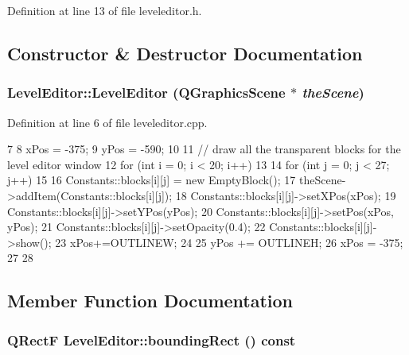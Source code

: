 Definition at line 13 of file leveleditor.h.

\subsection{Constructor \& Destructor Documentation}
\hypertarget{class_level_editor_a1d91bc06c0a93456587434b37fe726b4}{
\subsubsection[{LevelEditor}]{\setlength{\rightskip}{0pt plus 5cm}LevelEditor::LevelEditor (QGraphicsScene $\ast$ {\em theScene})}}
\label{class_level_editor_a1d91bc06c0a93456587434b37fe726b4}


Definition at line 6 of file leveleditor.cpp.


\begin{DoxyCode}
7 {
8     xPos = -375;
9     yPos = -590;
10 
11     // draw all the transparent blocks for the level editor window
12     for (int i = 0; i < 20; i++)
13     {
14         for (int j = 0; j < 27; j++)
15         {
16             Constants::blocks[i][j] = new EmptyBlock();
17             theScene->addItem(Constants::blocks[i][j]);
18             Constants::blocks[i][j]->setXPos(xPos);
19             Constants::blocks[i][j]->setYPos(yPos);
20             Constants::blocks[i][j]->setPos(xPos, yPos);
21             Constants::blocks[i][j]->setOpacity(0.4);
22             Constants::blocks[i][j]->show();
23             xPos+=OUTLINEW;
24         }
25         yPos += OUTLINEH;
26         xPos = -375;
27     }
28 }
\end{DoxyCode}


\subsection{Member Function Documentation}
\hypertarget{class_level_editor_a24ac36387e7530e9b1a1a783657ca36e}{
\subsubsection[{boundingRect}]{\setlength{\rightskip}{0pt plus 5cm}QRectF LevelEditor::boundingRect () const}}
\label{class_level_editor_a24ac36387e7530e9b1a1a783657ca36e}


